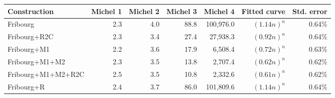 \begin{tabular}{lrrrrrr}
  \hline
Construction & Michel 1 & Michel 2 & Michel 3 & Michel 4 & Fitted curve & Std. error \\ 
  \hline
Fribourg & 2.3 & 4.0 & 88.8 & 100,976.0 & $(1.14n)^n$ & 0.64\% \\ 
  Fribourg+R2C & 2.3 & 3.4 & 27.4 & 27,938.3 & $(0.92n)^n$ & 0.64\% \\ 
  Fribourg+M1 & 2.2 & 3.6 & 17.9 & 6,508.4 & $(0.72n)^n$ & 0.63\% \\ 
  Fribourg+M1+M2 & 2.3 & 3.5 & 13.8 & 2,707.4 & $(0.62n)^n$ & 0.62\% \\ 
  Fribourg+M1+M2+R2C & 2.5 & 3.5 & 10.8 & 2,332.6 & $(0.61n)^n$ & 0.62\% \\ 
  Fribourg+R & 2.4 & 3.7 & 86.0 & 101,809.6 & $(1.14n)^n$ & 0.64\% \\ 
   \hline
\end{tabular}
